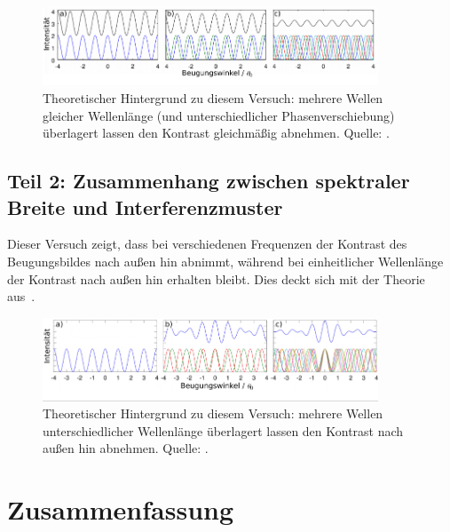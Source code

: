 \documentclass{article}
\begin{document}
\begin{figure}[H]
\caption{Theoretischer Hintergrund zu diesem Versuch: mehrere Wellen gleicher Wellenlänge (und unterschiedlicher Phasenverschiebung) überlagert lassen den Kontrast gleichmäßig abnehmen. Quelle: \cite{quelle6}.}
\includegraphics[width=10cm]{diskussion2.png}
\end{figure}




\subsection{Teil 2: Zusammenhang zwischen spektraler Breite und Interferenzmuster}


Dieser Versuch zeigt, dass bei verschiedenen Frequenzen der Kontrast des Beugungsbildes nach außen hin abnimmt, während bei einheitlicher Wellenlänge der Kontrast nach außen hin erhalten bleibt. Dies deckt sich mit der Theorie aus~\cite{quelle6}.

\begin{figure}[H]
\caption{Theoretischer Hintergrund zu diesem Versuch: mehrere Wellen unterschiedlicher Wellenlänge überlagert lassen den Kontrast nach außen hin abnehmen. Quelle: \cite{quelle6}.}
\includegraphics[width=10cm]{diskussion1.png}
\end{figure}



\section{Zusammenfassung}







\end{document}

